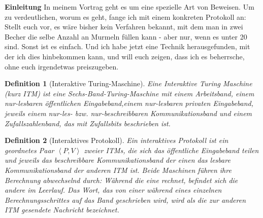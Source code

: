 \documentclass[12pt,a4paper,bibliography=totocnumbered,listof=totocnumbered]{scrartcl}
\newtheorem{definition}{Definition}
\begin{document}
\textbf{Einleitung} In meinem Vortrag geht es um eine spezielle Art von Beweisen. Um zu verdeutlichen, worum es geht, fange ich mit einem konkreten Protokoll an: Stellt euch vor, es wäre bisher kein Verfahren bekannt, mit dem man in zwei Becher die selbe Anzahl an Murmeln füllen kann - aber nur, wenn es unter 20 sind. Sonst ist es einfach. Und ich habe jetzt eine Technik herausgefunden, mit der ich dies hinbekommen kann, und will euch zeigen, dass ich es beherrsche, ohne euch irgendetwas preiszugeben.

\vspace{3mm}

\begin{definition}[Interaktive Turing-Maschine]
Eine Interaktive Turing Maschine (kurz ITM) ist eine Sechs-Band-Turing-Maschine mit einem \textnormal{Arbeitsband}, einem nur-lesbaren \glqq{}öffentlichen\grqq{} \textnormal{Eingabeband},einem nur-lesbaren \glqq{}privaten\grqq{} Eingabeband, jeweils einem nur-les- bzw. nur-beschreibbaren \textnormal{Kommunikationsband} und einem \textnormal{Zufallszahlenband}, das mit Zufallsbits beschrieben ist.
\end{definition}

\begin{definition}[Interaktives Protokoll]
Ein interaktives Protokoll ist ein geordnetes Paar \( \left< P, V \right> \) zweier ITMs, die sich das \glqq{}öffentliche\grqq{} Eingabeband teilen und jeweils das beschreibbare Kommunikationsband der einen das lesbare Kommunikationsband der anderen ITM ist. Beide Maschinen führen ihre Berechnung abwechselnd durch: Während die eine rechnet, befindet sich die andere im \glqq{}Leerlauf\grqq{}. Das Wort, das von einer während eines einzelnen Berechnungsschrittes auf das Band geschrieben wird, wird als die zur anderen ITM \textnormal{gesendete Nachricht} bezeichnet.
\end{definition}
\end{document}

